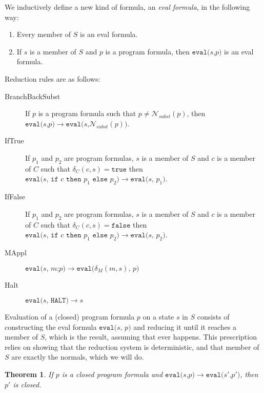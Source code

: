 \documentclass[11pt]{article}
\begin{document}
We inductively define a new kind of formula, an \emph{eval formula}, in the following way:

\begin{enumerate}
\item Every member of $S$ is an eval formula.
\item If $s$ is a member of $S$ and $p$ is a program formula, then $\texttt{eval(}s\texttt{,} p\texttt{)}$ is an eval formula.
\end{enumerate}

Reduction rules are as follows:

\begin{description}
\item[BranchBackSubst] If $p$ is a program formula such that $p \neq \mathcal{N}_{subst}(p)$, then $\texttt{eval(}s\texttt{,} p\texttt{)} \longrightarrow \texttt{eval(}s\texttt{,} \mathcal{N}_{subst}(p)\texttt{)}$.
\item[IfTrue] If $p_{1}$ and $p_{2}$ are program formulas, $s$ is a member of $S$ and $c$ is a member of $C$ such that $\delta_{C}(c, s) = \texttt{true}$ then \\ $\texttt{eval(} s \texttt{, } \texttt{if } c \texttt{ then } p_{1} \texttt{ else } p_{2} \texttt{)} \longrightarrow \texttt{eval(} s \texttt{, } p_{1} \texttt{)}$.
\item[IfFalse] If $p_{1}$ and $p_{2}$ are program formulas, $s$ is a member of $S$ and $c$ is a member of $C$ such that $\delta_{C}(c, s) = \texttt{false}$ then \\ $\texttt{eval(} s \texttt{, } \texttt{if } c \texttt{ then } p_{1} \texttt{ else } p_{2} \texttt{)} \longrightarrow \texttt{eval(} s \texttt{, } p_{2} \texttt{)}$.
\item[MAppl] $\texttt{eval(}s\texttt{, } m\texttt{;}p \texttt{)} \longrightarrow \texttt{eval(} \delta_{M}(m, s)\texttt{, } p \texttt{)}$
\item[Halt] $\texttt{eval(}s\texttt{, } \texttt{HALT)} \longrightarrow s$
\end{description}

Evaluation of a (closed) program formula $p$ on a state $s$ in $S$ consists of constructing the eval formula $\texttt{eval(}s\texttt{, } p \texttt{)}$ and reducing it until it reaches a member of $S$, which is the result, assuming that ever happens.  This prescription relies on showing that the reduction system is deterministic, and that member of $S$ are exactly the normals, which we will do.

\newtheorem*{closednessineval}{Theorem}
\begin{closednessineval}
If $p$ is a closed program formula and $\texttt{eval(}s\texttt{,} p\texttt{)} \longrightarrow \texttt{eval(}s'\texttt{,} p'\texttt{)}$, then $p'$ is closed.
\end{closednessineval}
\end{document}
